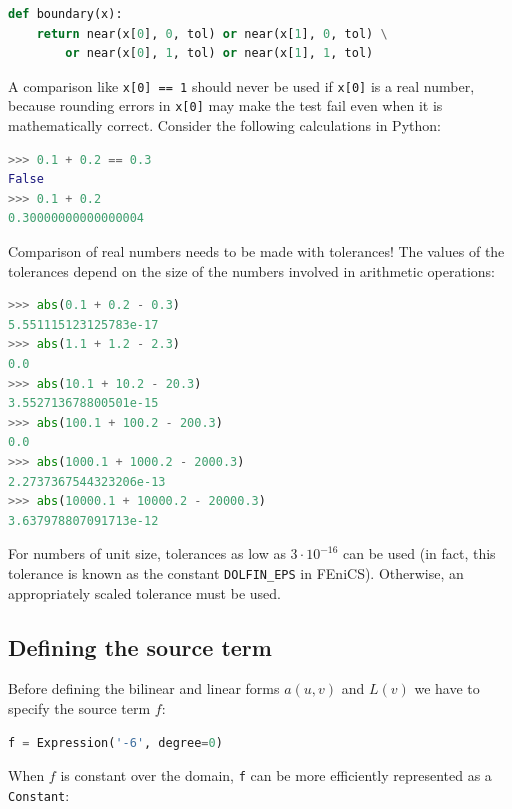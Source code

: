 \documentclass[graybox,envcountchap,sectrefs,final]{svmonodo}
\newenvironment{warning_mdfboxadmon}[1][]{
\begin{warning_mdfboxmdframed}[frametitle=#1]
}
{
\end{warning_mdfboxmdframed}
}
\begin{document}
\begin{lstlisting}[language=Python,style=graycolor]
def boundary(x):
    return near(x[0], 0, tol) or near(x[1], 0, tol) \
        or near(x[0], 1, tol) or near(x[1], 1, tol)
\end{lstlisting}


\begin{warning_mdfboxadmon}[Never use \texttt{==} for comparing real numbers!]
A comparison like \texttt{x[0] == 1} should never be used if \texttt{x[0]} is a real
number, because rounding errors in \texttt{x[0]} may make the test fail even
when it is mathematically correct. Consider the following calculations
in Python:

\begin{lstlisting}[language=Python,style=graycolor]
>>> 0.1 + 0.2 == 0.3
False
>>> 0.1 + 0.2
0.30000000000000004
\end{lstlisting}

Comparison of real numbers needs to be made with tolerances! The
values of the tolerances depend on the size of the numbers involved in
arithmetic operations:

\begin{lstlisting}[language=Python,style=graycolor]
>>> abs(0.1 + 0.2 - 0.3)
5.551115123125783e-17
>>> abs(1.1 + 1.2 - 2.3)
0.0
>>> abs(10.1 + 10.2 - 20.3)
3.552713678800501e-15
>>> abs(100.1 + 100.2 - 200.3)
0.0
>>> abs(1000.1 + 1000.2 - 2000.3)
2.2737367544323206e-13
>>> abs(10000.1 + 10000.2 - 20000.3)
3.637978807091713e-12
\end{lstlisting}
For numbers of unit size, tolerances as low as $3\cdot 10^{-16}$ can be used
(in fact, this tolerance is known as the constant \Verb!DOLFIN_EPS! in FEniCS).
Otherwise, an appropriately scaled tolerance must be used.
\end{warning_mdfboxadmon} %


\subsection{Defining the source term}

Before defining the bilinear and linear forms $a(u,v)$ and $L(v)$ we
have to specify the source term $f$:

\begin{lstlisting}[language=Python,style=graycolor]
f = Expression('-6', degree=0)
\end{lstlisting}
When $f$ is constant over the domain, \texttt{f} can be
more efficiently represented as a \texttt{Constant}:
\end{document}
